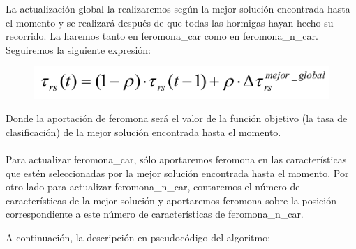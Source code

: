 La actualización global la realizaremos según la mejor solución encontrada hasta el momento y se realizará después de que todas las hormigas hayan hecho su recorrido. La haremos tanto en feromona\_car como en feromona\_n\_car. Seguiremos la siguiente expresión:
\begin{figure} [H]
\centering
\includegraphics[width=0.5\linewidth]{actualizaciongloba}
\label{fig:actualizaciongloba}
\end{figure}

Donde la aportación de feromona será el valor de la función objetivo (la tasa de clasificación) de la mejor solución encontrada hasta el momento.
\\
\\

Para actualizar feromona\_car, sólo aportaremos feromona en las características que estén seleccionadas por la mejor solución encontrada hasta el momento. Por otro lado para actualizar feromona\_n\_car, contaremos el número de características de la mejor solución y aportaremos feromona sobre la posición correspondiente a este número de características de feromona\_n\_car.

A continuación, la descripción en pseudocódigo del algoritmo:

